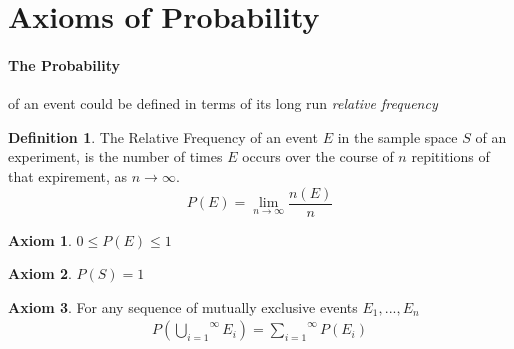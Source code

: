 \documentclass{article}
\theoremstyle{definition}
\newtheorem*{definition}{Definition}
\theoremstyle{axiom}
\newtheorem{axiom}{Axiom}
\theoremstyle{proposition}
\begin{document}
\section{Axioms of Probability}
\paragraph{The Probability} of an event could be defined in terms of its long run \textit{relative frequency}
\begin{definition}
  The Relative Frequency of an event $E$ in the sample space $S$ of an experiment, is the number of times $E$ occurs over the course of $n$ repititions of that expirement,
  as $n\to \infty$.
  \begin{equation}
    P(E)=\lim_{n\to \infty}\frac{n(E)}{n}
  \end{equation}
\end{definition}
\begin{axiom}
  $0 \leq P(E) \leq 1$
\end{axiom}
\begin{axiom}
  $P(S)=1$
\end{axiom}
\begin{axiom}
  For any sequence of mutually exclusive events $E_{1},...,E_{n}$
  \begin{align*}
    P
    \left(
    \stackrel{\infty}{
      \bigcup_{i=1}
    }
    E_{i}
    \right)=
    \stackrel{\infty}{
      \sum_{i=1}
    }
    P(E_{i})
  \end{align*}
\end{axiom}
\end{document}
